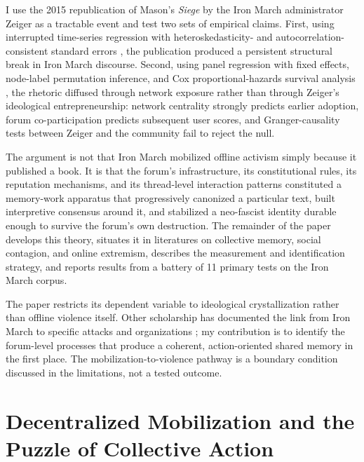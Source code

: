 \documentclass[bibtex,autowc,nonblind]{apsr_submission}
\begin{document}
I use the 2015 republication of Mason's \textit{Siege} by the Iron March administrator Zeiger as a tractable event and test two sets of empirical claims. First, using interrupted time-series regression with heteroskedasticity- and autocorrelation-consistent standard errors \citep{bernal2017interrupted, newey1987simple}, the publication produced a persistent structural break in Iron March discourse. Second, using panel regression with fixed effects, node-label permutation inference, and Cox proportional-hazards survival analysis \citep{cox1972regression, shalizi2011homophily}, the rhetoric diffused through network exposure rather than through Zeiger's ideological entrepreneurship: network centrality strongly predicts earlier adoption, forum co-participation predicts subsequent user scores, and Granger-causality tests between Zeiger and the community fail to reject the null.

The argument is not that Iron March mobilized offline activism simply because it published a book. It is that the forum's infrastructure, its constitutional rules, its reputation mechanisms, and its thread-level interaction patterns constituted a memory-work apparatus that progressively canonized a particular text, built interpretive consensus around it, and stabilized a neo-fascist identity durable enough to survive the forum's own destruction. The remainder of the paper develops this theory, situates it in literatures on collective memory, social contagion, and online extremism, describes the measurement and identification strategy, and reports results from a battery of 11 primary tests on the Iron March corpus.

The paper restricts its dependent variable to ideological crystallization rather than offline violence itself. Other scholarship has documented the link from Iron March to specific attacks and organizations \citep{upchurch, newhouse2021threat, sunshine2024neo, ware2019siege, belew2018bring}; my contribution is to identify the forum-level processes that produce a coherent, action-oriented shared memory in the first place. The mobilization-to-violence pathway is a boundary condition discussed in the limitations, not a tested outcome.

\section{Decentralized Mobilization and the Puzzle of Collective Action}
\end{document}
